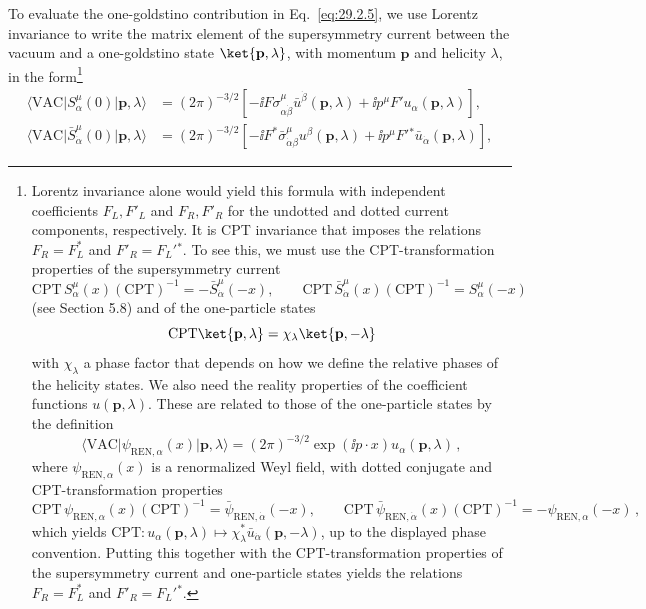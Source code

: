 To evaluate the one-goldstino contribution in Eq.~\eqref{eq:29.2.5}, we
use Lorentz invariance to write the matrix element of the supersymmetry
current between the vacuum and a one-goldstino state
\(\ket{\mathbf p,\lambda}\), with momentum \(\mathbf p\) and
helicity \(\lambda\), in the form\footnote{Lorentz invariance alone would
yield this formula with independent coefficients \(F_L,F'_L\) and
\(F_R,F'_R\) for the undotted and dotted current components,
respectively. It is CPT invariance that imposes the
relations \(F_R=F_L^*\) and \(F'_R=F_L'{}^*\). To see this, we must use the
CPT-transformation properties of the supersymmetry current
\[
  \mathrm{CPT}\,S^\mu_\alpha(x)(\mathrm{CPT})^{-1}
  =-\bar S^\mu_{\dot\alpha}(-x),
  \qquad
  \mathrm{CPT}\,\bar S^\mu_{\dot\alpha}(x)(\mathrm{CPT})^{-1}
  =S^\mu_\alpha(-x)
\]
(see Section 5.8) and of the one-particle states
\[
  \mathrm{CPT}\ket{\mathbf p,\lambda}
  =\chi_\lambda\ket{\mathbf p,-\lambda}
\]
with \(\chi_\lambda\) a phase factor that depends on how we define the
relative phases of the helicity states. We also need the reality
properties of the coefficient functions \(u(\mathbf p,\lambda)\). These
are related to those of the one-particle states by the definition
\[
  \langle\mathrm{VAC}\lvert\psi_{\mathrm{REN},\alpha}(x)
  \rvert\mathbf p,\lambda\rangle
  =(2\pi)^{-3/2}\exp(\ii p\mathbin{\cdot}x)
    u_\alpha(\mathbf p,\lambda)\,,
\]
where \(\psi_{\mathrm{REN},\alpha}(x)\) is a renormalized Weyl field,
with dotted conjugate and CPT-transformation properties
\[
  \mathrm{CPT}\,\psi_{\mathrm{REN},\alpha}(x)(\mathrm{CPT})^{-1}
  =\bar\psi_{\mathrm{REN},\dot\alpha}(-x),
  \qquad
  \mathrm{CPT}\,\bar\psi_{\mathrm{REN},\dot\alpha}(x)
    (\mathrm{CPT})^{-1}
  =-\psi_{\mathrm{REN},\alpha}(-x)\,,
\]
which yields
\(\mathrm{CPT}:u_\alpha(\mathbf p,\lambda)
\mapsto\chi_\lambda^*\bar u_{\dot\alpha}(\mathbf p,-\lambda)\), up to
the displayed phase convention. Putting this together with the
CPT-transformation properties of the supersymmetry current and
one-particle states yields the relations \(F_R=F_L^*\) and
\(F'_R=F_L'{}^*\).}
\begin{equation}
  \begin{aligned}
  \langle\mathrm{VAC}\lvert S^\mu_\alpha(0)
    \rvert\mathbf p,\lambda\rangle
  &=(2\pi)^{-3/2}\left[
    -\ii F\sigma^\mu_{\alpha\dot\beta}
      \bar u^{\dot\beta}(\mathbf p,\lambda)
    +\ii p^\mu F'u_\alpha(\mathbf p,\lambda)\right],
  \\
  \langle\mathrm{VAC}\lvert\bar S^\mu_{\dot\alpha}(0)
    \rvert\mathbf p,\lambda\rangle
  &=(2\pi)^{-3/2}\left[
    -\ii F^*\bar\sigma^\mu_{\dot\alpha\beta}
      u^\beta(\mathbf p,\lambda)
    +\ii p^\mu F'{}^*\bar u_{\dot\alpha}(\mathbf p,\lambda)\right],
  \end{aligned}
  \tag{29.2.7}\label{eq:29.2.7}
\end{equation}
